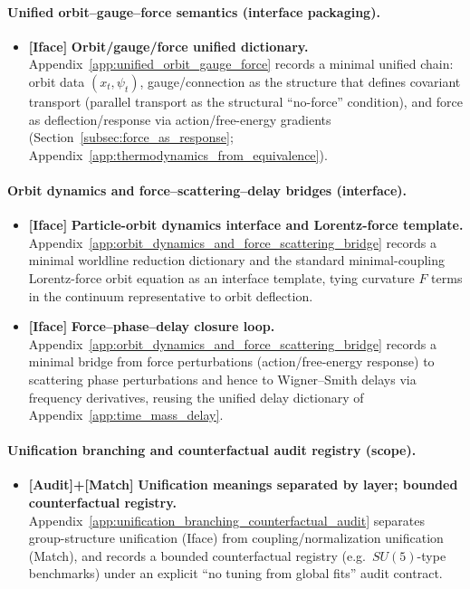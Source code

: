 \paragraph{Unified orbit--gauge--force semantics (interface packaging).}
\begin{itemize}
\item \textbf{[Iface]} \textbf{Orbit/gauge/force unified dictionary.}
Appendix~\ref{app:unified_orbit_gauge_force} records a minimal unified chain: orbit data $(x_t,\psi_t)$, gauge/connection as the structure that defines covariant transport (parallel transport as the structural ``no-force'' condition), and force as deflection/response via action/free-energy gradients (Section~\ref{subsec:force_as_response}; Appendix~\ref{app:thermodynamics_from_equivalence}).
\end{itemize}

\paragraph{Orbit dynamics and force--scattering--delay bridges (interface).}
\begin{itemize}
\item \textbf{[Iface]} \textbf{Particle-orbit dynamics interface and Lorentz-force template.}
Appendix~\ref{app:orbit_dynamics_and_force_scattering_bridge} records a minimal worldline reduction dictionary and the standard minimal-coupling Lorentz-force orbit equation as an interface template, tying curvature $F$ terms in the continuum representative to orbit deflection.
\item \textbf{[Iface]} \textbf{Force--phase--delay closure loop.}
Appendix~\ref{app:orbit_dynamics_and_force_scattering_bridge} records a minimal bridge from force perturbations (action/free-energy response) to scattering phase perturbations and hence to Wigner--Smith delays via frequency derivatives, reusing the unified delay dictionary of Appendix~\ref{app:time_mass_delay}.
\end{itemize}

\paragraph{Unification branching and counterfactual audit registry (scope).}
\begin{itemize}
\item \textbf{[Audit]+[Match]} \textbf{Unification meanings separated by layer; bounded counterfactual registry.}
Appendix~\ref{app:unification_branching_counterfactual_audit} separates group-structure unification (Iface) from coupling/normalization unification (Match), and records a bounded counterfactual registry (e.g.\ $SU(5)$-type benchmarks) under an explicit ``no tuning from global fits'' audit contract.
\end{itemize}

